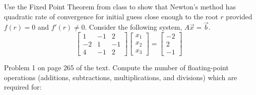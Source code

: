 \documentclass[addpoints, 11pt]{exam}
\begin{document}
\begin{questions}
\question Use the Fixed Point Theorem from class to show that Newton's method has quadratic rate of convergence for initial guess close enough to the root $r$ provided $f(r)=0$ and $f'(r)\neq 0$.
\question Consider the following system, $A\vec{x}=\vec{b}$.
$$
\left[
\begin{array}{ccc}
1 & -1 & 2 \\
-2 & 1 & -1 \\
4 & -1 & 2
\end{array}
\right] 
\left[
\begin{array}{c}
x_1 \\
x_2 \\
x_3
\end{array}
\right]
= \left[
\begin{array}{c}
-2 \\ 
2 \\
-1
\end{array}
\right]
$$ 
\question Problem 1 on page 265 of the text.
\question Compute the number of floating-point operations (additions, subtractions, multiplications, and divisions) which are required for:
\end{questions}
\end{document}
